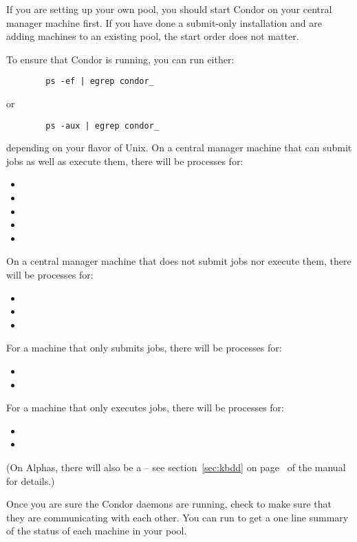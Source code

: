 If you are setting up your own pool, you should start Condor on your
central manager machine first.  If you have done a submit-only
installation and are adding machines to an existing pool,
the start order does not
matter.

To ensure that Condor is running, you can run either:
\begin{verbatim}
        ps -ef | egrep condor_
\end{verbatim}
or
\begin{verbatim}
        ps -aux | egrep condor_
\end{verbatim}
depending on your flavor of Unix.  
On a central manager machine that can submit jobs as well
as execute them, there will be processes for:
\begin{itemize}
	\item {}
	\item {}
	\item {}
	\item {}
	\item {}
\end{itemize}
On a central manager machine that does not submit jobs nor
execute them, there will be processes for:
\begin{itemize}
	\item {}
	\item {}
	\item {}
\end{itemize}
For a machine that only submits jobs, there will be processes for:
\begin{itemize}
	\item {}
	\item {}
\end{itemize}
For a machine that only executes jobs, there will be processes for:
\begin{itemize}
	\item {}
	\item {}
\end{itemize}
(\Note On Alphas, there will also be a
	 -- see section~\ref{sec:kbdd} on
	page~\pageref{sec:kbdd} of the manual for details.) 

Once you are sure the Condor daemons are running, check to make sure
that they are communicating with each other.  You can run
 to get a one line summary of the status of each
machine in your pool.

